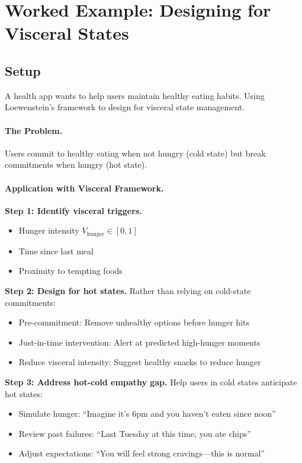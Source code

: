 \section{Worked Example: Designing for Visceral States}
\label{sec:lo-example}

\subsection{Setup}
A health app wants to help users maintain healthy eating habits. Using Loewenstein's framework to design for visceral state management.

\paragraph{The Problem.} Users commit to healthy eating when not hungry (cold state) but break commitments when hungry (hot state).

\paragraph{Application with Visceral Framework.}

\textbf{Step 1: Identify visceral triggers.}
\begin{itemize}[nosep]
\item Hunger intensity $V_{\text{hunger}} \in [0,1]$
\item Time since last meal
\item Proximity to tempting foods
\end{itemize}

\textbf{Step 2: Design for hot states.}
Rather than relying on cold-state commitments:
\begin{itemize}[nosep]
\item Pre-commitment: Remove unhealthy options before hunger hits
\item Just-in-time intervention: Alert at predicted high-hunger moments
\item Reduce visceral intensity: Suggest healthy snacks to reduce hunger
\end{itemize}

\textbf{Step 3: Address hot-cold empathy gap.}
Help users in cold states anticipate hot states:
\begin{itemize}[nosep]
\item Simulate hunger: ``Imagine it's 6pm and you haven't eaten since noon''
\item Review past failures: ``Last Tuesday at this time, you ate chips''
\item Adjust expectations: ``You will feel strong cravings---this is normal''
\end{itemize}

